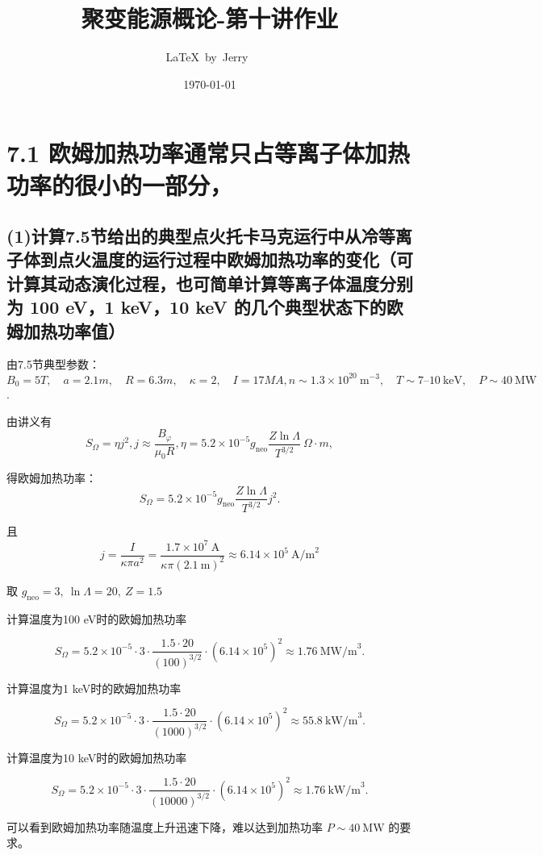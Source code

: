 \documentclass{article}
\title{聚变能源概论-第十讲作业}
\author{\LaTeX\ by\ Jerry\ }
\date{\today}
\begin{document}
\pagestyle{fancy}

\fancyhead[R]{\today}

\section*{7.1 欧姆加热功率通常只占等离子体加热功率的很小的一部分，}

\subsection*{(1)计算7.5节给出的典型点火托卡马克运行中从冷等离子体到点火温度的运行过程中欧姆加热功率的变化（可计算其动态演化过程，也可简单计算等离子体温度分别为 100 eV，1 keV，10 keV 的几个典型状态下的欧姆加热功率值）}

由7.5节典型参数：$ B_0 = 5T, \quad a = 2.1m, \quad R = 6.3m, \quad \kappa = 2, \quad I = 17MA, n \sim 1.3 \times 10^{20} \ \text{m}^{-3}, \quad T \sim 7 \text{--} 10 \ \text{keV}, \quad P \sim 40 \ \text{MW} $.

由讲义有$$S_\Omega = \eta j^2,j \approx \frac{B_\varphi}{\mu_0 R},\eta = 5.2 \times 10^{-5} g_{\text{neo}} \frac{Z \ln \Lambda}{T^{3/2}} \ \Omega \cdot m,$$

得欧姆加热功率：$$S_\Omega = 5.2 \times 10^{-5} g_{\text{neo}} \frac{Z \ln \Lambda}{T^{3/2}} j^2.$$

且$$ j = \frac{I}{\kappa \pi a^2} = \frac{1.7 \times 10^7 \ \text{A}}{\kappa \pi (2.1 \ \text{m})^2} \approx 6.14 \times 10^5 \ \text{A/m}^2 $$

取 $ g_{\text{neo}} = 3, \ \ln \Lambda = 20, \ Z = 1.5 $

计算温度为100 eV时的欧姆加热功率

$$S_\Omega = 5.2 \times 10^{-5} \cdot 3 \cdot \frac{1.5 \cdot 20}{(100)^{{3/2}}} \cdot (6.14 \times 10^5)^2 \approx 1.76 \ \text{MW/m}^3.$$

计算温度为1 keV时的欧姆加热功率

$$S_\Omega = 5.2 \times 10^{-5} \cdot 3 \cdot \frac{1.5 \cdot 20}{(1000)^{{3/2}}} \cdot (6.14 \times 10^5)^2 \approx 55.8 \ \text{kW/m}^3.$$

计算温度为10 keV时的欧姆加热功率

$$S_\Omega = 5.2 \times 10^{-5} \cdot 3 \cdot \frac{1.5 \cdot 20}{(10000)^{{3/2}}} \cdot (6.14 \times 10^5)^2 \approx 1.76 \ \text{kW/m}^3.$$

可以看到欧姆加热功率随温度上升迅速下降，难以达到加热功率 $ P \sim 40 \ \text{MW} $ 的要求。
\end{document}
